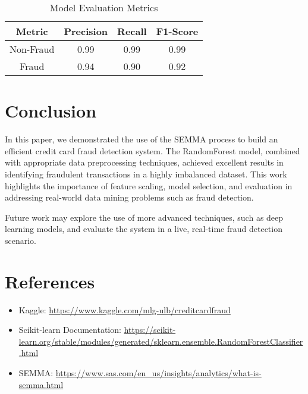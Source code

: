 \documentclass[12pt]{article}
\begin{document}
\begin{table}[H]
    \centering
    \caption{Model Evaluation Metrics}
    \begin{tabular}{|c|c|c|c|}
        \hline
        Metric & Precision & Recall & F1-Score \\
        \hline
        Non-Fraud & 0.99 & 0.99 & 0.99 \\
        Fraud & 0.94 & 0.90 & 0.92 \\
        \hline
    \end{tabular}
    \label{tab:results}
\end{table}

\section{Conclusion}
In this paper, we demonstrated the use of the SEMMA process to build an efficient credit card fraud detection system. The RandomForest model, combined with appropriate data preprocessing techniques, achieved excellent results in identifying fraudulent transactions in a highly imbalanced dataset. This work highlights the importance of feature scaling, model selection, and evaluation in addressing real-world data mining problems such as fraud detection.

Future work may explore the use of more advanced techniques, such as deep learning models, and evaluate the system in a live, real-time fraud detection scenario.

\section{References}
\begin{itemize}
    \item Kaggle: \url{https://www.kaggle.com/mlg-ulb/creditcardfraud}
    \item Scikit-learn Documentation: \url{https://scikit-learn.org/stable/modules/generated/sklearn.ensemble.RandomForestClassifier.html}
    \item SEMMA: \url{https://www.sas.com/en_us/insights/analytics/what-is-semma.html}
\end{itemize}
\end{document}
